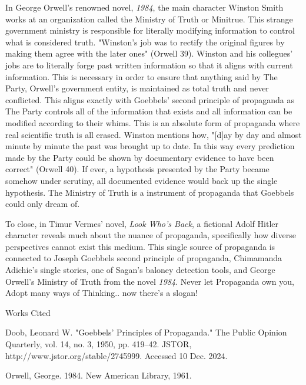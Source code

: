 \documentclass[12pt]{article}
\begin{document}
In George Orwell's renowned novel, \textit{1984}, the main character Winston Smith
works at an organization called the Ministry of Truth or Minitrue. This strange government ministry is responsible for
literally modifying information to control what is considered truth. "Winston's job was to rectify the original
figures by making them agree with the later ones" (Orwell 39). Winston and his collegues' jobs are to
literally forge past written information so that it aligns with current information. This is necessary in order to
ensure that anything said by The Party, Orwell's government entity, is maintained as total truth and never conflicted.
This aligns exactly with Goebbels' second principle of propaganda as The Party controls all of the information that exists
and all information can be modified according to their whims. This is an absolute form of propaganda where real scientific
truth is all erased. Winston mentions how, "[d]ay by day and almost minute by minute the past was
brought up to date. In this way every prediction made by the Party could be shown by documentary evidence to have been correct"
(Orwell 40). If ever, a hypothesis presented by the Party became somehow under scrutiny, all documented evidence
would back up the single hypothesis. The Ministry of Truth is a instrument of propaganda that Goebbels
could only dream of.

To close, in Timur Vermes' novel, \textit{Look Who's Back}, a fictional Adolf Hitler character reveals much about the nuance
of propaganda, specifically how diverse perspectives cannot exist this medium. This single source of propaganda is
connected to Joseph Goebbels second principle of propaganda, Chimamanda Adichie's single stories,
one of Sagan's baloney detection tools, and George Orwell's Ministry of Truth from the novel \textit{1984}.
Never let Propaganda own you, Adopt many ways of Thinking.. now there's a slogan!

\newpage

\begin{center}
Works Cited
\end{center}

\begin{hangparas}{0.5in}{1}

Doob, Leonard W. "Goebbels’ Principles of Propaganda." The Public Opinion Quarterly,
vol. 14, no. 3, 1950, pp. 419–42. JSTOR, http://www.jstor.org/stable/2745999. Accessed 10 Dec. 2024.

Orwell, George. 1984. New American Library, 1961.

\end{hangparas}
\end{document}
